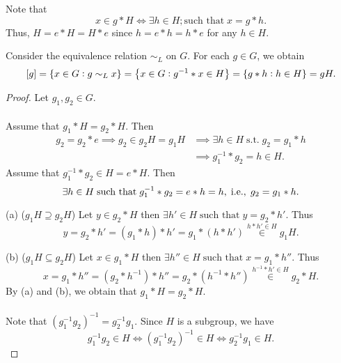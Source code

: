 \documentclass[11pt,openany]{article}
\begin{document}
\begin{remark*}
	Note that \[
	x\in g\ast H\iff\exists h\in H; \text{such that}\;x=g\ast h.
	\] Thus, $H=e\ast H=H\ast e$ since $h=e\ast h=h\ast e$ for any $h\in H$.
\end{remark*}
\begin{remark*}
	Consider the equivalence relation $\sim_L$ on $G$. For each $g\in G$, we obtain \[
	[g]=\set{x\in G: g\sim_L x}=\set[1]{x\in G:g^{-1}\ast x\in H}=\set{g\ast h:h\in H}=gH.
	\]
\end{remark*}
\newpage
{}
\begin{proof}
	Let $g_1,g_2\in G$. \\
	\ \\
	\text{[(1)$\Rightarrow$(2)]}\; Assume that $g_1\ast H=g_2\ast H$. Then \begin{align*}
		g_2=g_2\ast e\implies g_2\in g_2H=g_1H &\implies \exists h\in H\; \text{s.t.}\; g_2=g_1\ast h\\
		&\implies g_1^{-1}\ast g_2=h\in H.
	\end{align*}
	\text{[(2)$\Rightarrow$(1)]}\; Assume that $g_1^{-1}\ast g_2\in H=e\ast H$. Then \[
	\exists h\in H\;\text{such that}\; g_1^{-1}\ast g_2=e\ast h=h,\; \textnormal{i.e.},\; g_2=g_1\ast h.
	\]\par
	(a) ($g_1H\supseteq g_2H$)\; Let $y\in g_2\ast H$ then $\exists h'\in H\; \text{such that}\; y=g_2\ast h'$. Thus \[
	y=g_2\ast h'=(g_1\ast h)\ast h'=g_1\ast (h\ast h')\overset{h\ast h'\in H}{\in} g_1H.
	\]\par
	(b) ($g_1H\subseteq g_2H$)\; Let $x\in g_1\ast H$ then $\exists h''\in H\; \text{such that}\; x=g_1\ast h''$. Thus \[
	x=g_1\ast h''=(g_2\ast h^{-1})\ast h''=g_2\ast (h^{-1}\ast h'')\overset{h^{-1}\ast h'\in H}{\in} g_2\ast H.
	\] By (a) and (b), we obtain that $g_1\ast H=g_2\ast H$.
	\\ \ \\
	\text{[(2)$\Leftrightarrow$(3)]}\; Note that $(g_1^{-1}g_2)^{-1}=g_2^{-1}g_1$. Since $H$ is a subgroup, we have \[
	g_1^{-1}g_2\in H\iff (g_1^{-1}g_2)^{-1}\in H\iff g_2^{-1}g_1\in H.
	\]
\end{proof}
\end{document}
